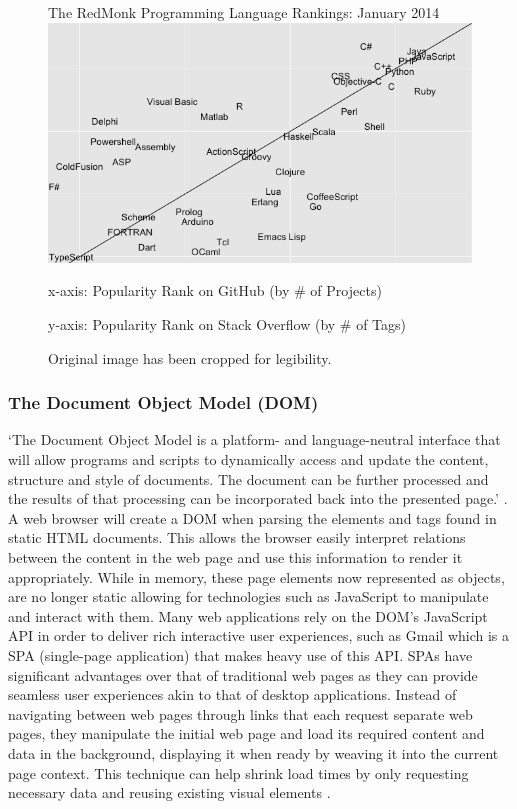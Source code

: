 \documentclass[final]{cmpreport}
\begin{document}

\begin{figure}[h!]{The RedMonk Programming Language Rankings: January 2014 \label{ranking}}
  \includegraphics[width=1.0\textwidth]{lang-rank-114-wm.png}
  \begin{tablenotes}
    \item x-axis: Popularity Rank on GitHub (by \# of Projects)
    \item y-axis: Popularity Rank on Stack Overflow (by \# of Tags)
    \item Original image has been cropped for legibility.
  \end{tablenotes}
\end{figure}

\subsubsection{The Document Object Model (DOM)}
`The Document Object Model is a platform- and language-neutral interface that will allow programs and scripts to dynamically access and update the content, structure and style of documents. The document can be further processed and the results of that processing can be incorporated back into the presented page.' \citep{W3C3}. A web browser will create a DOM when parsing the elements and tags found in static HTML documents. This allows the browser easily interpret relations between the content in the web page and use this information to render it appropriately. While in memory, these page elements now represented as objects, are no longer static allowing for technologies such as JavaScript to manipulate and interact with them. Many web applications rely on the DOM's JavaScript API in order to deliver rich interactive user experiences, such as Gmail which is a SPA (single-page application) that makes heavy use of this API. SPAs have significant advantages over that of traditional web pages as they can provide seamless user experiences akin to that of desktop applications. Instead of navigating between web pages through links that each request separate web pages, they manipulate the initial web page and load its required content and data in the background, displaying it when ready by weaving it into the current page context. This technique can help shrink load times by only requesting necessary data and reusing existing visual elements \citep{Takada}.
\end{document}
